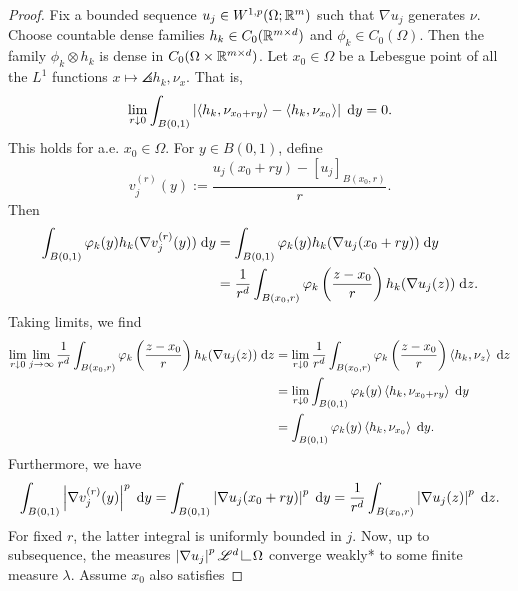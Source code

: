 \begin{proof}
    Fix a bounded sequence $u_j \in W^{1,p}(\Omega;\mathbb{R}^m)$ such that $\nabla u_j$ generates $\nu$. Choose countable dense families $h_k \in C_0(\mathbb{R}^{m \times d})$ and $\phi_k \in C_0(\Omega)$. Then the family $\phi_k \otimes h_k$ is dense in $C_0(\Omega \times \mathbb{R}^{m \times d})$. Let $x_0 \in \Omega$ be a Lebesgue point of all the $L^1$ functions $x \mapsto \angles{h_k,\nu_x}$. That is,
    \begin{equation}
        \lim_{r \downarrow 0} \int_{B(0,1)} \left\lvert {\left\langle {h_k,\nu_{x_0 + ry}} \right\rangle - \left\langle {h_k,\nu_{x_0}} \right\rangle} \right\rvert \; \mathrm{d} y = 0.
    \end{equation}
    This holds for a.e. $x_0 \in \Omega$. For $y \in B(0,1)$, define 
    \begin{equation}
        v_j^{(r)}(y) := \frac{u_j(x_0 + ry) - [u_j]_{B(x_0,r)}}{r}.
    \end{equation}
    Then 
    \begin{equation} \begin{aligned}
        \int_{B(0,1)} \varphi_k(y) h_k(\nabla v_j^{(r)}(y)) \; \mathrm{d} y &= \int_{B(0,1)} \varphi_k(y) h_k(\nabla u_j(x_0 + ry)) \; \mathrm{d} y \\
        &= \frac{1}{r^d} \int_{B(x_0,r)} \varphi_k\left( { \frac{z - x_0}{r} } \right) h_k(\nabla u_j(z)) \; \mathrm{d} z.
    \end{aligned} \end{equation}
    Taking limits, we find 
    \begin{equation} \begin{aligned}
        \lim_{r \downarrow 0} \lim_{j \to \infty} \frac{1}{r^d} \int_{B(x_0,r)} \varphi_k\left( { \frac{z - x_0}{r} } \right) h_k(\nabla u_j(z)) \; \mathrm{d} z
        &= \lim_{r \downarrow 0} \frac{1}{r^d} \int_{B(x_0,r)} \varphi_k\left( { \frac{z-x_0}{r} } \right) \left\langle { h_k, \nu_z } \right\rangle \; \mathrm{d} z \\
        &= \lim_{r \downarrow 0} \int_{B(0,1)} \varphi_k(y) \left\langle { h_k, \nu_{x_0 + ry} } \right\rangle \; \mathrm{d} y \\
        &= \int_{B(0,1)} \varphi_k(y) \left\langle { h_k, \nu_{x_0} } \right\rangle \; \mathrm{d} y.
    \end{aligned} \end{equation}
    Furthermore, we have 
    \begin{equation}
        \int_{B(0,1)} \left\lvert {\nabla v_j^{(r)}(y)} \right\rvert^p \; \mathrm{d} y = \int_{B(0,1)} \left\lvert { \nabla u_j(x_0 + ry) } \right\rvert^p \; \mathrm{d} y
        = \frac{1}{r^d} \int_{B(x_0,r)} \left\lvert { \nabla u_j(z) } \right\rvert^p \; \mathrm{d} z.
    \end{equation}
    For fixed $r$, the latter integral is uniformly bounded in $j$. Now, up to subsequence, the measures $\abs{ \nabla u_j }^p \scrL^d \restrict \Omega$ converge weakly* to some finite measure $\lambda$. Assume $x_0$ also satisfies 

\end{proof}
